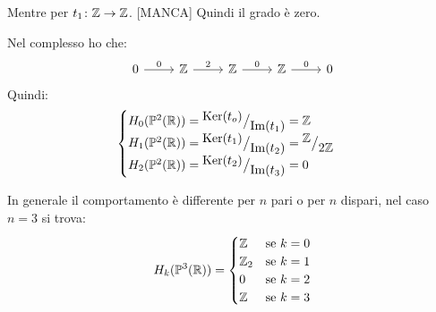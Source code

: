 \begin{example}[$\Pjr{2}$]
  Mentre per $ t_1 \colon \mathbb{Z} \to \mathbb{Z} $. [MANCA]
  Quindi il grado è zero.

  Nel complesso ho che:
  \[
    \begin{tikzcd}
      0 \rar{0} & \Z \rar{2} & \Z \rar{0} & \Z \rar{0} & 0
    \end{tikzcd}
  \]
  Quindi:
  \[
    \begin{cases}
      H_0(\mathbb{P}^{2} (\mathbb{R})) = {^{\textstyle \mathrm{Ker}( t_o)}\big/_{\textstyle \mathrm{Im}( t_1 )}} = \mathbb{Z} \\
      H_1(\mathbb{P}^{2} (\mathbb{R})) = {^{\textstyle \mathrm{Ker}( t_1)}\big/_{\textstyle \mathrm{Im}( t_2 )}} = {^{\textstyle \mathbb{Z}}\big/_{\textstyle 2\mathbb{Z}}} \\
      H_2(\mathbb{P}^{2} (\mathbb{R})) = {^{\textstyle \mathrm{Ker}( t_2)}\big/_{\textstyle \mathrm{Im}( t_3 )}} = 0
    \end{cases}
  \]
\end{example}
\begin{example}[$\Pjr{3}$]
  In generale il comportamento è differente per $ n $ pari o per $ n $
  dispari, nel caso $ n = 3 $ si trova:
  \[
    H_k(\mathbb{P}^{3} (\mathbb{R})) =
    \begin{cases}
      \mathbb{Z} & \text{se } k = 0 \\
      \mathbb{Z}_2 & \text{se } k = 1 \\
      0 & \text{se } k = 2 \\
      \mathbb{Z} & \text{se } k = 3
    \end{cases}
  \]
\end{example}

